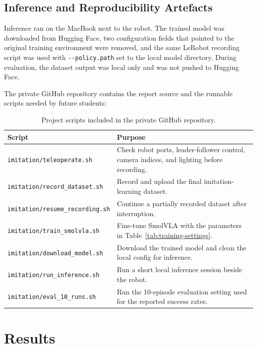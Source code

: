 \documentclass[11pt, a4paper]{article}
\begin{document}
\subsection{Inference and Reproducibility Artefacts}

Inference ran on the MacBook next to the robot. The trained model was downloaded from Hugging Face, two configuration fields that pointed to the original training environment were removed, and the same LeRobot recording script was used with \texttt{-{}-policy.path} set to the local model directory. During evaluation, the dataset output was local only and was not pushed to Hugging Face.

The private GitHub repository contains the report source and the runnable scripts needed by future students:

\begin{table}[H]
\centering
\renewcommand{\arraystretch}{1.2}
\begin{tabular}{@{}p{}p{}@{}}
\toprule
\textbf{Script} & \textbf{Purpose} \\ \midrule
\texttt{imitation/teleoperate.sh} & Check robot ports, leader-follower control, camera indices, and lighting before recording. \\
\texttt{imitation/record\_dataset.sh} & Record and upload the final imitation-learning dataset. \\
\texttt{imitation/resume\_recording.sh} & Continue a partially recorded dataset after interruption. \\
\texttt{imitation/train\_smolvla.sh} & Fine-tune SmolVLA with the parameters in Table~\ref{tab:training-settings}. \\
\texttt{imitation/download\_model.sh} & Download the trained model and clean the local config for inference. \\
\texttt{imitation/run\_inference.sh} & Run a short local inference session beside the robot. \\
\texttt{imitation/eval\_10\_runs.sh} & Run the 10-episode evaluation setting used for the reported success rates. \\
\bottomrule
\end{tabular}
\caption{Project scripts included in the private GitHub repository.}
\label{tab:repo-scripts}
\end{table}

\section{Results}
\label{sec:results}
\end{document}
